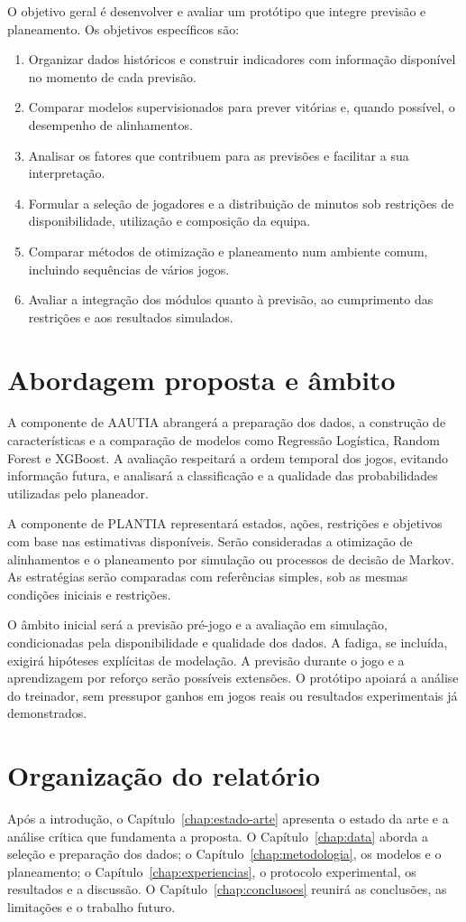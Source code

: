 O objetivo geral é desenvolver e avaliar um protótipo que integre previsão
e planeamento. Os objetivos específicos são:

\begin{enumerate}
  \item Organizar dados históricos e construir indicadores com informação
  disponível no momento de cada previsão.
  \item Comparar modelos supervisionados para prever vitórias e, quando
  possível, o desempenho de alinhamentos.
  \item Analisar os fatores que contribuem para as previsões e facilitar
  a sua interpretação.
  \item Formular a seleção de jogadores e a distribuição de minutos sob
  restrições de disponibilidade, utilização e composição da equipa.
  \item Comparar métodos de otimização e planeamento num ambiente comum,
  incluindo sequências de vários jogos.
  \item Avaliar a integração dos módulos quanto à previsão, ao cumprimento
  das restrições e aos resultados simulados.
\end{enumerate}

\section{Abordagem proposta e âmbito}

A componente de AAUTIA abrangerá a preparação dos dados, a construção de
características e a comparação de modelos como Regressão Logística,
Random Forest e XGBoost. A avaliação respeitará a ordem temporal dos jogos,
evitando informação futura, e analisará a classificação e a qualidade das
probabilidades utilizadas pelo planeador.

A componente de PLANTIA representará estados, ações, restrições e objetivos
com base nas estimativas disponíveis. Serão consideradas a otimização de
alinhamentos e o planeamento por simulação ou processos de decisão de
Markov. As estratégias serão comparadas com referências simples, sob as
mesmas condições iniciais e restrições.

O âmbito inicial será a previsão pré-jogo e a avaliação em simulação,
condicionadas pela disponibilidade e qualidade dos dados. A fadiga, se
incluída, exigirá hipóteses explícitas de modelação. A previsão durante o
jogo e a aprendizagem por reforço serão possíveis extensões. O protótipo
apoiará a análise do treinador, sem pressupor ganhos em jogos reais ou
resultados experimentais já demonstrados.

\section{Organização do relatório}

Após a introdução, o Capítulo~\ref{chap:estado-arte} apresenta o estado da
arte e a análise crítica que fundamenta a proposta.
O Capítulo~\ref{chap:data} aborda a seleção e preparação dos dados;
o Capítulo~\ref{chap:metodologia}, os modelos e o planeamento; o Capítulo~\ref{chap:experiencias}, o protocolo
experimental, os resultados e a discussão.
O Capítulo~\ref{chap:conclusoes} reunirá as conclusões, as limitações e o
trabalho futuro.

